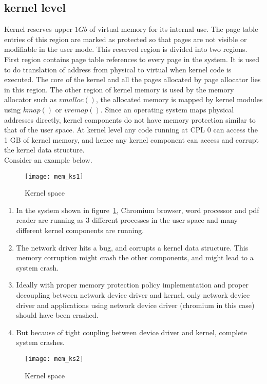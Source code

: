 \subsection{kernel level}

Kernel reserves upper $1Gb$ of virtual memory for its internal use. The page table entries of this region are marked as protected so that pages are not visible or modifiable in the user mode. This reserved region is divided into two regions. First region contains page table references to every page in the system. It is used to do translation of address from physical to virtual when kernel code is executed. The core of the kernel and all the pages allocated by page allocator lies in this region. The other region of kernel memory is used by the memory allocator such as $vmalloc()$, the allocated memory is mapped by kernel modules using $kmap()$ or $vremap()$. Since an operating system maps physical addresses directly, kernel components do not have memory protection similar to that of the user space. At kernel level any code running at CPL 0 can access the 1 GB of kernel memory, and hence any kernel component can access and corrupt the kernel data structure. 
\\
Consider an example below.
\begin{figure}[!ht]
\centering
\texttt{[image: mem\_ks1]}
\caption{Kernel space}
\label{fig:Kernel space1}
\end{figure}

\begin{enumerate}
\item In the system shown in figure~\ref{fig:Kernel space1}, Chromium browser, word processor and pdf reader are running as 3 different processes in the user space and many different kernel components are running.
\item The network driver hits a bug, and corrupts a kernel data structure. This memory corruption might crash the other components, and might lead to a system crash.
\item Ideally with proper memory protection policy implementation and proper decoupling between network device driver and kernel, only network device driver and applications using network device driver (chromium in this case) should have been crashed. 
\item But because of tight coupling between device driver and kernel, complete system crashes.
\end{enumerate}

\begin{figure}[!ht]
\centering
\texttt{[image: mem\_ks2]}
\caption{Kernel space}
\label{fig:Kernel space2}
\end{figure}

